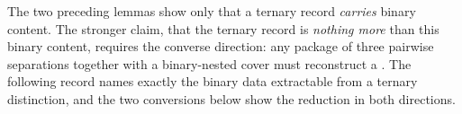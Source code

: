 \documentclass[11pt]{article}
\begin{document}
The two preceding lemmas show only that a ternary record \emph{carries}
binary content.  The stronger claim, that the ternary record is
\emph{nothing more} than this binary content, requires the converse
direction: any package of three pairwise separations together with a
binary-nested cover must reconstruct a 
.  The following record names exactly the binary data
extractable from a ternary distinction, and the two conversions below
show the reduction in both directions.

\begin{code}%
\>[0]\<%
\\
\>[0]\AgdaSpace{}%
\AgdaSpace{}%
\AgdaSymbol{:}\AgdaSpace{}%
\AgdaSpace{}%
\<%
\\
\>[0][@{}l@{\AgdaIndent{0}}]%
\>[2]\<%
\\
\>[2][@{}l@{\AgdaIndent{0}}]%
\>[4]%
\>[10]\AgdaSymbol{:}\AgdaSpace{}%
\<%
\\
%
\>[4]%
\>[10]\AgdaSymbol{:}\AgdaSpace{}%
\<%
\\
%
\>[4]%
\>[10]\AgdaSymbol{:}\AgdaSpace{}%
\<%
\\
%
\>[4]%
\>[10]\AgdaSymbol{:}\AgdaSpace{}%
\<%
\\
%
\>[4]\AgdaSpace{}%
\AgdaSymbol{:}\AgdaSpace{}%
\AgdaSpace{}%
\AgdaSymbol{(}\AgdaSpace{}%
\AgdaSpace{}%
\AgdaSymbol{)}\<%
\\
%
\>[4]\AgdaSpace{}%
\AgdaSymbol{:}\AgdaSpace{}%
\AgdaSpace{}%
\AgdaSymbol{(}\AgdaSpace{}%
\AgdaSpace{}%
\AgdaSymbol{)}\<%
\\
%
\>[4]\AgdaSpace{}%
\AgdaSymbol{:}\AgdaSpace{}%
\AgdaSpace{}%
\AgdaSymbol{(}\AgdaSpace{}%
\AgdaSpace{}%
\AgdaSymbol{)}\<%
\\
%
\>[4]\AgdaSpace{}%
\AgdaSymbol{:}\AgdaSpace{}%
\AgdaSymbol{(}\AgdaSpace{}%
\AgdaSymbol{:}\AgdaSpace{}%
\AgdaSymbol{)}\AgdaSpace{}%
\AgdaSpace{}%
\AgdaSymbol{(}\AgdaSpace{}%

\end{code}
\end{document}
